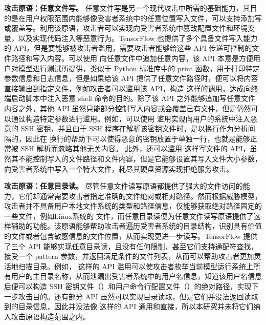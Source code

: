 \textbf{攻击原语：任意文件写。}
任意文件写是另一个现代攻击中所需的基础能力，其目的是在用户权限范围内能够像受害者系统中的任意位置写入文件，可以支持添加写或覆盖写。利用该原语，攻击者可以实现向受害者系统中篡改配置文件和环境变量，以及实现代码注入等恶意行为。TensorFlow 也提供了多个具备文件写入能力的 API，但是要能够被攻击者滥用，需要攻击者能够给这些 API 传递可控制的文件路径和写入内容。可以使用  向任意文件中追加任意内容，该 API 本意是方便用户对模型进行测试所提供，类似于 Python 标准库中的 print 函数，用于打印特定参数信息和日志信息，但是如果给该 API 提供了任意文件路径时，便可以将内容直接输出到指定文件，例如攻击者可以滥用该 API，构造  这样的调用，达成向终端启动脚本中注入恶意 shell 命令的目的。除了该 API 之外能够追加写任意文件内容之外，其他 API 虽然只能部分控制写入内容或会覆盖已有文件，但是仍然可以通过构造特定参数进行滥用。例如，可以使用  滥用实现向用户的系统中注入恶意的 SSH 密钥，并且由于 SSH 程序在解析该密钥文件时，是以换行作为分析间隔的，因此在  换行的帮助下可以使得恶意的密钥放置于单独一行，也就是能够正常被 SSH 解析而忽略其他无关内容。
此外，还可以滥用  这样写文件的 API，虽然其不能控制写入的文件路径和文件内容，但是它能够设置其写入文件大小参数，向受害者系统中写入一个特大文件，耗尽其硬盘资源实现拒绝服务攻击。

\textbf{攻击原语：任意目录读。}
尽管任意文件读写原语都提供了强大的文件访问的能力，它们却通常需要攻击者指定准确的文件绝对或相对路径。然而根据威胁模型，攻击者并不具备用户本地文件系统的类型和路径信息，仅能够获取绝对路径固定的一些文件，例如Linux系统的  文件，而任意目录读便为任意文件读写原语提供了这样辅助的功能。该原语能够帮助攻击者遍历受害者系统的目录结构，识别具有价值的文件或者包含敏感信息的文件位置，从而实现更进一步读写。TensorFlow 提供了三个 API 能够实现任意目录读，且没有任何限制，甚至它们支持通配符查找，接受一个 pattern 参数，并返回满足条件的文件列表，从而可以帮助攻击者更加灵活地扫描目录。例如，  这样的 API 滥用可以使攻击者枚举当前模型运行系统上所有用户的主目录名称，从而泄漏出受害者系统中的用户名信息，知道该用户名信息后便可以构造 SSH 密钥文件（）和用户命令行配置文件（）的绝对路径，实现下一步攻击目的。还有部分 API 虽然可以实现目录读取，但是它们并没法返回读取到的目录信息，因此并没法像  这样的 API 通用和直接，所以本研究并未将它们纳入攻击原语构造范围之内。

